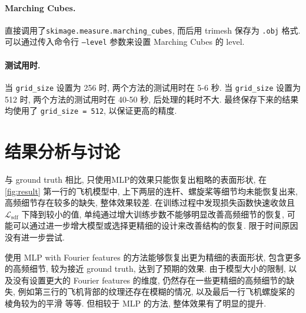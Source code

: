 \documentclass[11pt]{article}
\newcommand\1{\mathds{1}}
\begin{document}
\paragraph{Marching Cubes.} 直接调用了\texttt{skimage.measure.marching\_cubes}, 而后用 trimesh 保存为 \texttt{.obj} 格式.
可以通过传入命令行 \texttt{--level} 参数来设置 Marching Cubes 的 level.

\paragraph{测试用时.} 当 \texttt{grid\_size} 设置为 256 时, 两个方法的测试用时在 5-6 秒. 当 \texttt{grid\_size} 设置为 512 时, 两个方法的测试用时在 40-50 秒, 后处理的耗时不大. 
最终保存下来的结果均使用了 \texttt{grid\_size = 512}, 以保证更高的精度.

\section{结果分析与讨论}
与 ground truth 相比, 只使用MLP的效果只能恢复出粗略的表面形状, 在 \cref{fig:result} 第一行的飞机模型中, 上下两层的连杆、螺旋桨等细节均未能恢复出来, 高频细节存在较多的缺失, 整体效果较差. 在训练过程中发现损失函数快速收敛且 $\mathcal{L}_{\text{sdf}}$ 下降到较小的值, 单纯通过增大训练步数不能够明显改善高频细节的恢复, 可能可以通过进一步增大模型或选择更精细的设计来改善结构的恢复. 限于时间原因没有进一步尝试.

使用 MLP with Fourier features 的方法能够恢复出更为精细的表面形状, 包含更多的高频细节, 较为接近 ground truth, 达到了预期的效果. 由于模型大小的限制, 以及没有设置更大的 Fourier features 的维度, 仍然存在一些更精细的高频细节的缺失, 例如第三行的飞机背部的纹理还存在模糊的情况, 以及最后一行飞机螺旋桨的棱角较为的平滑 等等. 但相较于 MLP 的方法, 整体效果有了明显的提升.

 
 
\end{document}

